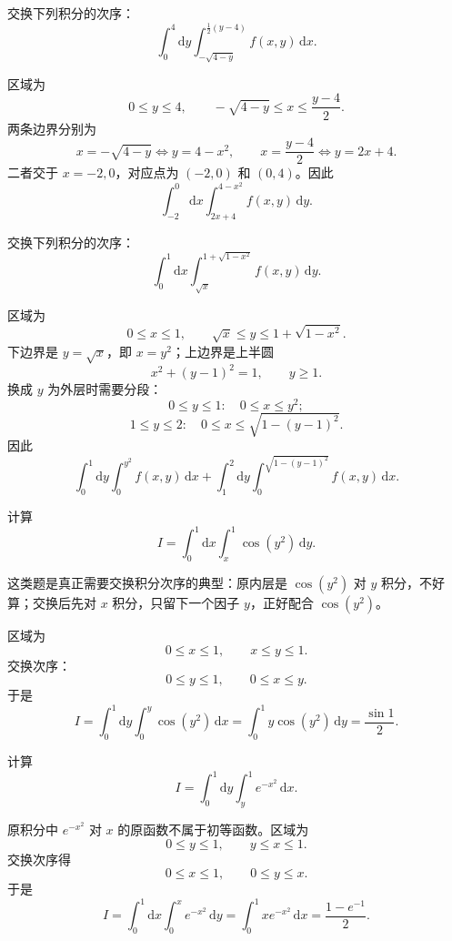 \documentclass[answer,fontset=fandol]{THUExam}
\begin{document}
\begin{problem}
交换下列积分的次序：
\[
\int_0^4 \mathrm{d}y \int_{-\sqrt{4-y}}^{\frac{1}{2}(y-4)} f(x,y)\,\mathrm{d}x.
\]
\end{problem}
\begin{solution}
区域为
\[
0\leqslant y\leqslant4,\qquad
-\sqrt{4-y}\leqslant x\leqslant\frac{y-4}{2}.
\]
两条边界分别为
\[
x=-\sqrt{4-y}\Longleftrightarrow y=4-x^2,\qquad
x=\frac{y-4}{2}\Longleftrightarrow y=2x+4.
\]
二者交于 $x=-2,0$，对应点为 $(-2,0)$ 和 $(0,4)$。因此
\[
\boxed{
\int_{-2}^0\mathrm{d}x\int_{2x+4}^{4-x^2}f(x,y)\,\mathrm{d}y
}.
\]
\end{solution}
\bigskip

\begin{problem}
交换下列积分的次序：
\[
\int_0^1 \mathrm{d}x \int_{\sqrt{x}}^{1+\sqrt{1-x^2}} f(x,y)\,\mathrm{d}y.
\]
\end{problem}
\begin{solution}
区域为
\[
0\leqslant x\leqslant1,\qquad
\sqrt{x}\leqslant y\leqslant1+\sqrt{1-x^2}.
\]
下边界是 $y=\sqrt{x}$，即 $x=y^2$；上边界是上半圆
\[
x^2+(y-1)^2=1,\qquad y\geqslant1.
\]
换成 $y$ 为外层时需要分段：
\[
0\leqslant y\leqslant1:\quad 0\leqslant x\leqslant y^2;
\]
\[
1\leqslant y\leqslant2:\quad 0\leqslant x\leqslant\sqrt{1-(y-1)^2}.
\]
因此
\[
\boxed{
\int_0^1\mathrm{d}y\int_0^{y^2}f(x,y)\,\mathrm{d}x
+\int_1^2\mathrm{d}y\int_0^{\sqrt{1-(y-1)^2}}f(x,y)\,\mathrm{d}x
}.
\]
\end{solution}
\bigskip

\begin{problem}
计算
\[
I=\int_0^1\mathrm{d}x\int_x^1 \cos(y^2)\,\mathrm{d}y.
\]
\end{problem}
\begin{note}
这类题是真正需要交换积分次序的典型：原内层是 $\cos(y^2)$ 对 $y$ 积分，不好算；交换后先对 $x$ 积分，只留下一个因子 $y$，正好配合 $\cos(y^2)$。
\end{note}
\begin{solution}
区域为
\[
0\leqslant x\leqslant1,\qquad x\leqslant y\leqslant1.
\]
交换次序：
\[
0\leqslant y\leqslant1,\qquad 0\leqslant x\leqslant y.
\]
于是
\[
I=\int_0^1\mathrm{d}y\int_0^y \cos(y^2)\,\mathrm{d}x
=\int_0^1 y\cos(y^2)\,\mathrm{d}y
=\boxed{\frac{\sin1}{2}}.
\]
\end{solution}
\bigskip

\begin{problem}
计算
\[
I=\int_0^1\mathrm{d}y\int_y^1 e^{-x^2}\,\mathrm{d}x.
\]
\end{problem}
\begin{solution}
原积分中 $e^{-x^2}$ 对 $x$ 的原函数不属于初等函数。区域为
\[
0\leqslant y\leqslant1,\qquad y\leqslant x\leqslant1.
\]
交换次序得
\[
0\leqslant x\leqslant1,\qquad 0\leqslant y\leqslant x.
\]
于是
\[
I=\int_0^1\mathrm{d}x\int_0^x e^{-x^2}\,\mathrm{d}y
=\int_0^1 xe^{-x^2}\,\mathrm{d}x
=\boxed{\frac{1-e^{-1}}{2}}.
\]
\end{solution}
\bigskip
\end{document}
